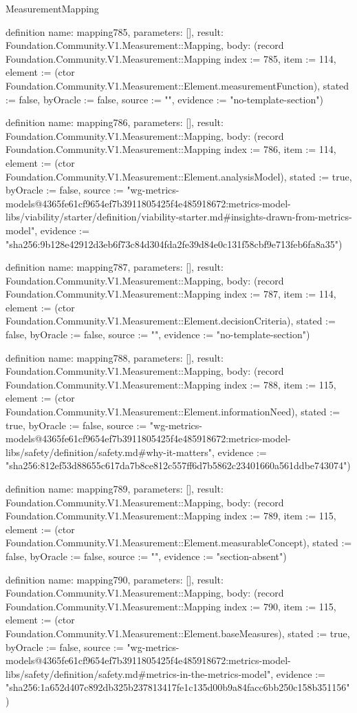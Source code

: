 \begin{lexlean}{MeasurementMapping}
\begin{semanticmodule}
definition{
  name: mapping785,
  parameters: [],
  result: Foundation.Community.V1.Measurement::Mapping,
  body: (record Foundation.Community.V1.Measurement::Mapping {index := 785, item := 114, element := (ctor Foundation.Community.V1.Measurement::Element.measurementFunction), stated := false, byOracle := false, source := "", evidence := "no-template-section"})
}

definition{
  name: mapping786,
  parameters: [],
  result: Foundation.Community.V1.Measurement::Mapping,
  body: (record Foundation.Community.V1.Measurement::Mapping {index := 786, item := 114, element := (ctor Foundation.Community.V1.Measurement::Element.analysisModel), stated := true, byOracle := false, source := "wg-metrics-models@4365fe61cf9654ef7b3911805425f4e485918672:metrics-model-libs/viability/starter/definition/viability-starter.md#insights-drawn-from-metrics-model", evidence := "sha256:9b128e42912d3eb6f73c84d304fda2fe39d84e0c131f58cbf9e713feb6fa8a35"})
}

definition{
  name: mapping787,
  parameters: [],
  result: Foundation.Community.V1.Measurement::Mapping,
  body: (record Foundation.Community.V1.Measurement::Mapping {index := 787, item := 114, element := (ctor Foundation.Community.V1.Measurement::Element.decisionCriteria), stated := false, byOracle := false, source := "", evidence := "no-template-section"})
}

definition{
  name: mapping788,
  parameters: [],
  result: Foundation.Community.V1.Measurement::Mapping,
  body: (record Foundation.Community.V1.Measurement::Mapping {index := 788, item := 115, element := (ctor Foundation.Community.V1.Measurement::Element.informationNeed), stated := true, byOracle := false, source := "wg-metrics-models@4365fe61cf9654ef7b3911805425f4e485918672:metrics-model-libs/safety/definition/safety.md#why-it-matters", evidence := "sha256:812ef53d88655c617da7b8ce812c557ff6d7b5862c23401660a561ddbe743074"})
}

definition{
  name: mapping789,
  parameters: [],
  result: Foundation.Community.V1.Measurement::Mapping,
  body: (record Foundation.Community.V1.Measurement::Mapping {index := 789, item := 115, element := (ctor Foundation.Community.V1.Measurement::Element.measurableConcept), stated := false, byOracle := false, source := "", evidence := "section-absent"})
}

definition{
  name: mapping790,
  parameters: [],
  result: Foundation.Community.V1.Measurement::Mapping,
  body: (record Foundation.Community.V1.Measurement::Mapping {index := 790, item := 115, element := (ctor Foundation.Community.V1.Measurement::Element.baseMeasures), stated := true, byOracle := false, source := "wg-metrics-models@4365fe61cf9654ef7b3911805425f4e485918672:metrics-model-libs/safety/definition/safety.md#metrics-in-the-metrics-model", evidence := "sha256:1a652d407c892db325b237813417fe1c135d00b9a84facc6bb250c158b351156"})
}


\end{semanticmodule}
\end{lexlean}
